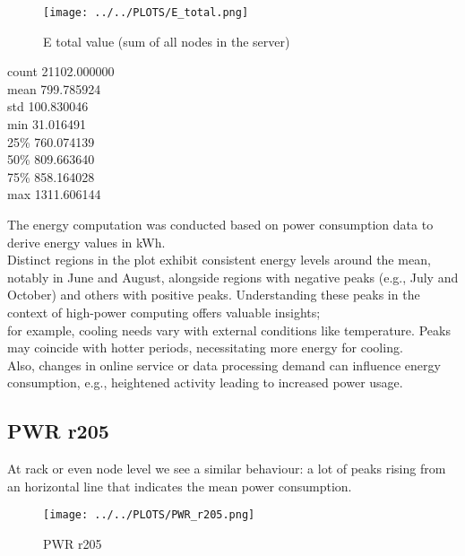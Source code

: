 \begin{figure}[H]
\centering
\texttt{[image: ../../PLOTS/E\_total.png]}
\captionsetup{skip=-10pt}
\caption{E total value (sum of all nodes in the server)}
\label{fig:E_total}
\end{figure}

\begin{center}
count    21102.000000 \\
mean       799.785924 \\
std        100.830046 \\
min         31.016491 \\
25\%        760.074139 \\
50\%        809.663640 \\
75\%        858.164028 \\
max       1311.606144
\end{center}

\noindent
The energy computation was conducted based on power consumption data to derive energy values in kWh. \\
Distinct regions in the plot exhibit consistent energy levels around the mean, notably in June and August, alongside regions with negative peaks (e.g., July and October) and others with positive peaks. Understanding these peaks in the context of high-power computing offers valuable insights; \\
for example, cooling needs vary with external conditions like temperature. Peaks may coincide with hotter periods, necessitating more energy for cooling. \\
Also, changes in online service or data processing demand can influence energy consumption, e.g., heightened activity leading to increased power usage.

\subsection{PWR r205}
At rack or even node level we see a similar behaviour: a lot of peaks rising from an horizontal line that indicates the mean power consumption. 

\vspace{-15pt}

\begin{figure}[H]
\centering
\texttt{[image: ../../PLOTS/PWR\_r205.png]}
\captionsetup{skip=-10pt}
\caption{PWR r205}
\label{fig:PWR_r205}
\end{figure}

